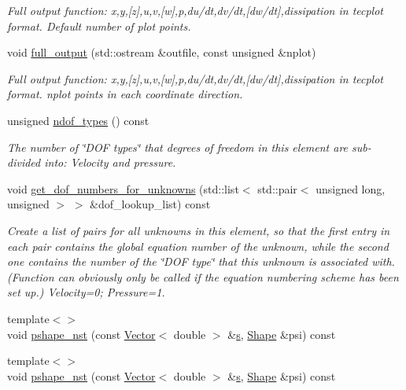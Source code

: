 \begin{DoxyCompactItemize}
\begin{DoxyCompactList}\small\item\em Full output function\+: x,y,\mbox{[}z\mbox{]},u,v,\mbox{[}w\mbox{]},p,du/dt,dv/dt,\mbox{[}dw/dt\mbox{]},dissipation in tecplot format. Default number of plot points. \end{DoxyCompactList}\item 
void \hyperlink{classoomph_1_1GeneralisedNewtonianQCrouzeixRaviartElement_ab1fbf72fd8f16795905b03faa8ad9076}{full\+\_\+output} (std\+::ostream \&outfile, const unsigned \&nplot)
\begin{DoxyCompactList}\small\item\em Full output function\+: x,y,\mbox{[}z\mbox{]},u,v,\mbox{[}w\mbox{]},p,du/dt,dv/dt,\mbox{[}dw/dt\mbox{]},dissipation in tecplot format. nplot points in each coordinate direction. \end{DoxyCompactList}\item 
unsigned \hyperlink{classoomph_1_1GeneralisedNewtonianQCrouzeixRaviartElement_ab29a7d2d94cc785438a76986b36de0a3}{ndof\+\_\+types} () const
\begin{DoxyCompactList}\small\item\em The number of \char`\"{}\+D\+O\+F types\char`\"{} that degrees of freedom in this element are sub-\/divided into\+: Velocity and pressure. \end{DoxyCompactList}\item 
void \hyperlink{classoomph_1_1GeneralisedNewtonianQCrouzeixRaviartElement_a149673f13602b36ed16a660950d6355f}{get\+\_\+dof\+\_\+numbers\+\_\+for\+\_\+unknowns} (std\+::list$<$ std\+::pair$<$ unsigned long, unsigned $>$ $>$ \&dof\+\_\+lookup\+\_\+list) const
\begin{DoxyCompactList}\small\item\em Create a list of pairs for all unknowns in this element, so that the first entry in each pair contains the global equation number of the unknown, while the second one contains the number of the \char`\"{}\+D\+O\+F type\char`\"{} that this unknown is associated with. (Function can obviously only be called if the equation numbering scheme has been set up.) Velocity=0; Pressure=1. \end{DoxyCompactList}\item 
{\footnotesize template$<$$>$ }\\void \hyperlink{classoomph_1_1GeneralisedNewtonianQCrouzeixRaviartElement_a9a7743f0db402afea8f792cc6cc8ea49}{pshape\+\_\+nst} (const \hyperlink{classoomph_1_1Vector}{Vector}$<$ double $>$ \&\hyperlink{cfortran_8h_ab7123126e4885ef647dd9c6e3807a21c}{s}, \hyperlink{classoomph_1_1Shape}{Shape} \&psi) const
\item 
{\footnotesize template$<$$>$ }\\void \hyperlink{classoomph_1_1GeneralisedNewtonianQCrouzeixRaviartElement_a976bf34e5d42bb8f2fd105818d59076c}{pshape\+\_\+nst} (const \hyperlink{classoomph_1_1Vector}{Vector}$<$ double $>$ \&\hyperlink{cfortran_8h_ab7123126e4885ef647dd9c6e3807a21c}{s}, \hyperlink{classoomph_1_1Shape}{Shape} \&psi) const
\end{DoxyCompactItemize}
